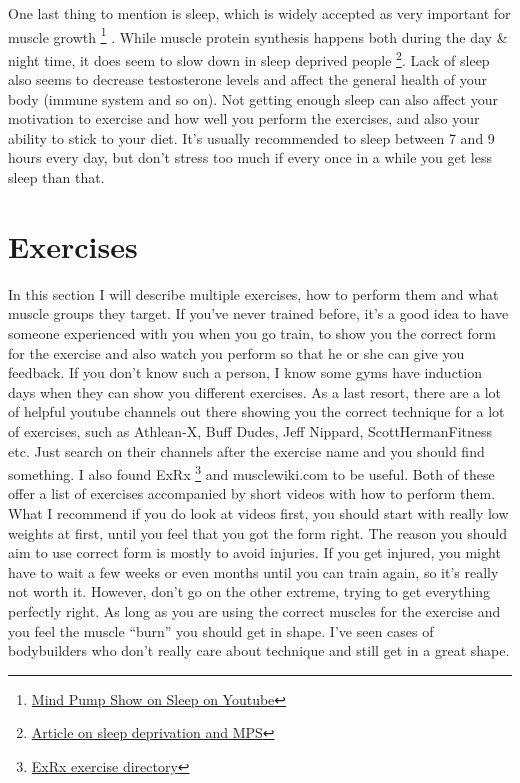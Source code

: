 \documentclass[openany, 12pt]{book}
\begin{document}
        One last thing to mention is sleep, which is widely accepted as very important for muscle growth
        \footnote{\href{https://www.youtube.com/watch?v=13y7P8I8rWo}{Mind Pump Show on Sleep on Youtube}}
        . While muscle protein synthesis happens both during the day \& night time,
        it does seem to slow down in sleep deprived people
        \footnote{\href{https://www.ncbi.nlm.nih.gov/pmc/articles/PMC7785053/}{Article on sleep deprivation and MPS}}. Lack of sleep also seems to decrease testosterone levels and affect
        the general health of your body (immune system and so on). Not getting enough sleep can also affect your motivation to exercise and how well you perform the exercises,
        and also your ability to stick to your diet. It's usually recommended to sleep between 7 and 9 hours every day, but don't stress too much if every once in a while you get less sleep than that.

        \section{Exercises}

        In this section I will describe multiple exercises, how to perform them and what muscle groups they target.
        If you've never trained before, it's a good idea to have someone experienced with you when you go train, to show you the correct form for the exercise
        and also watch you perform so that he or she can give you feedback. If you don't know such a person, I know some gyms have induction days when they can show you
        different exercises. As a last resort, there are a lot of helpful youtube channels out there showing you the correct technique for a lot of exercises, such as
        Athlean-X, Buff Dudes, Jeff Nippard, ScottHermanFitness etc. Just search on their channels after the exercise name and you should find something.
        I also found ExRx
        \footnote{\href{https://exrx.net/Lists/Directory}{ExRx exercise directory}} and 
        musclewiki.com to be useful. Both of these offer a list of exercises accompanied by short videos with how to perform them.
        What I recommend if you do look at videos first, you should start with really low weights at first, until you feel that you got the form right.
        The reason you should aim to use correct form is mostly to avoid injuries. If you get injured, you might have to wait a few weeks or even months until
        you can train again, so it's really not worth it. However, don't go on the other extreme, trying to get everything perfectly right. As long as you are
        using the correct muscles for the exercise and you feel the muscle ``burn'' you should get in shape. I've seen cases of bodybuilders who don't really care
        about technique and still get in a great shape.
        
\end{document}
